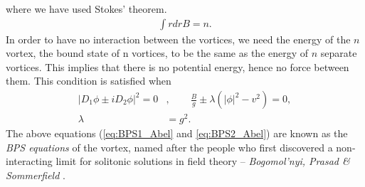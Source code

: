     where we have used Stokes' theorem.
    \begin{align}
        \int r dr B = n.
    \end{align}
    In order to have no interaction between the vortices, we need the energy of the $n$ vortex, the bound state of n vortices, to be the same as the energy of $n$ separate vortices. This implies that there is no potential energy, hence no force between them. This condition is satisfied when
    \begin{align}
        |D_1\phi \pm i D_2 \phi|^2 =0&,  \qquad \frac{B}{g} \pm \lambda \left(|\phi|^2 -v^2  \right) =0, \label{eq:BPS1_Abel}\\
        \lambda &= g^2 .\label{eq:BPS2_Abel}
    \end{align}
    The above equations (\eqref{eq:BPS1_Abel} and \eqref{eq:BPS2_Abel}) are known as the \textit{BPS equations} of the vortex, named after the people who first discovered a non-interacting limit for solitonic solutions in field theory -- \textit{Bogomol'nyi, Prasad \& Sommerfield} \cite{Bogomolny:1975de} \cite{Prasad:1975kr}.
    

